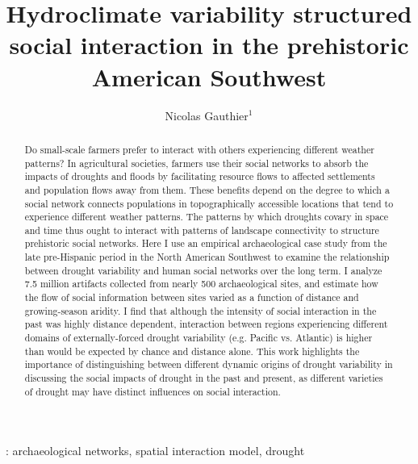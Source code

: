 \documentclass[10pt]{iopart}
\begin{document}
\title{Hydroclimate variability structured social interaction in the prehistoric American Southwest}

\author{Nicolas Gauthier$^1$}

\address{$^1$ School of Human Evolution and Social Change, 900 S Cady Mall, Tempe, USA}


\begin{abstract}
  Do small-scale farmers prefer to interact with others experiencing different weather patterns? In agricultural societies, farmers use their social networks to absorb the impacts of droughts and floods by facilitating resource flows to affected settlements and population flows away from them. These benefits depend on the degree to which a social network connects populations in topographically accessible locations that tend to experience different weather patterns. The patterns by which droughts covary in space and time thus ought to interact with patterns of landscape connectivity to structure prehistoric social networks. Here I use an empirical archaeological case study from the late pre-Hispanic period in the North American Southwest to examine the relationship between drought variability and human social networks over the long term. I analyze 7.5 million artifacts collected from nearly 500 archaeological sites, and estimate how the flow of social information between sites varied as a function of distance and growing-season aridity. I find that although the intensity of social interaction in the past was highly distance dependent, interaction between regions experiencing different domains of externally-forced drought variability (e.g. Pacific vs. Atlantic) is higher than would be expected by chance and distance alone. This work highlights the importance of distinguishing between different dynamic origins of drought variability in discussing the social impacts of drought in the past and present, as different varieties of drought may have distinct influences on social interaction.
\end{abstract}

: archaeological networks, spatial interaction model, drought

\maketitle

\ioptwocol
\end{document}
